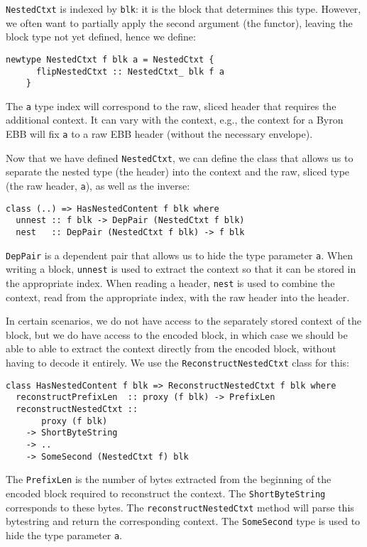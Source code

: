 \lstinline!NestedCtxt! is indexed by \lstinline!blk!: it is the block that
determines this type. However, we often want to partially apply the second
argument (the functor), leaving the block type not yet defined, hence we define:
\begin{lstlisting}
newtype NestedCtxt f blk a = NestedCtxt {
      flipNestedCtxt :: NestedCtxt_ blk f a
    }
\end{lstlisting}
The \lstinline!a! type index will correspond to the raw, sliced header that
requires the additional context. It can vary with the context, e.g., the context
for a Byron EBB will fix \lstinline!a! to a raw EBB header (without the
necessary envelope).

Now that we have defined \lstinline!NestedCtxt!, we can define the class that
allows us to separate the nested type (the header) into the context and the raw,
sliced type (the raw header, \lstinline!a!), as well as the inverse:
\begin{lstlisting}
class (..) => HasNestedContent f blk where
  unnest :: f blk -> DepPair (NestedCtxt f blk)
  nest   :: DepPair (NestedCtxt f blk) -> f blk
\end{lstlisting}
\lstinline!DepPair! is a dependent pair that allows us to hide the type
parameter \lstinline!a!. When writing a block, \lstinline!unnest! is used to
extract the context so that it can be stored in the appropriate index. When
reading a header, \lstinline!nest! is used to combine the context, read from the
appropriate index, with the raw header into the header.

In certain scenarios, we do not have access to the separately stored context of
the block, but we do have access to the encoded block, in which case we should
be able to able to extract the context directly from the encoded block, without
having to decode it entirely. We use the \lstinline!ReconstructNestedCtxt! class
for this:
\begin{lstlisting}
class HasNestedContent f blk => ReconstructNestedCtxt f blk where
  reconstructPrefixLen  :: proxy (f blk) -> PrefixLen
  reconstructNestedCtxt ::
       proxy (f blk)
    -> ShortByteString
    -> ..
    -> SomeSecond (NestedCtxt f) blk
\end{lstlisting}
The \lstinline!PrefixLen! is the number of bytes extracted from the beginning of
the encoded block required to reconstruct the context. The
\lstinline!ShortByteString! corresponds to these bytes. The
\lstinline!reconstructNestedCtxt! method will parse this bytestring and return
the corresponding context. The \lstinline!SomeSecond! type is used to hide the
type parameter \lstinline!a!.

